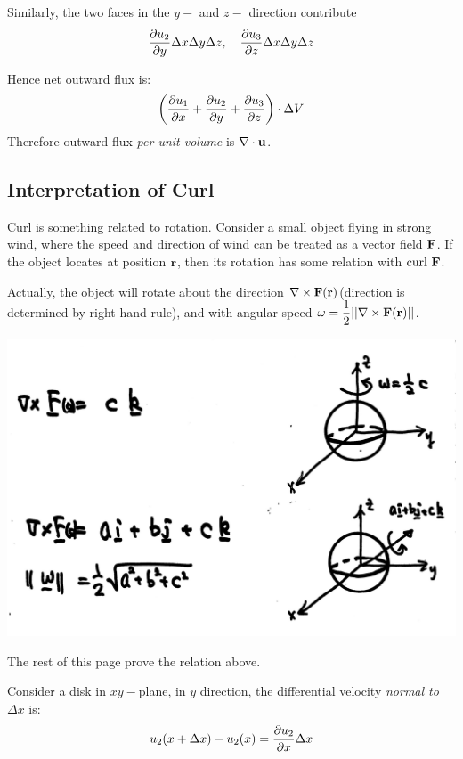 \begin{spacing}{1.3}
    Similarly, the two faces in the $y-$ and $z-$ direction contribute 
    $$\frac{\pt u_2}{\pt y} \Delta x \Delta y \Delta z, \quad \frac{\pt u_3}{\pt z} \Delta x \Delta y \Delta z$$

    Hence net outward flux is: 
    $$\left(\frac{\pt u_1}{\pt x} + \frac{\pt u_2}{\pt y} + \frac{\pt u_3}{\pt z}\right)\cdot \Delta V$$
    Therefore outward flux {\it per unit volume} is $\nabla \cdot \uu$.



    \newpage
    \subsection{Interpretation of Curl}

    Curl is something related to rotation. Consider a small object flying in strong wind,
    where the speed and direction of wind can be treated as a vector field $\FF$. If the object 
    locates at position $\rr$, then its rotation has some relation with $\curl \FF$.

    Actually, the object will rotate about the direction $\nabla \times \FF(\rr)$(direction 
    is determined by right-hand rule), and with angular speed $\omega = \dfrac{1}{2} ||\nabla \times \FF(\rr)||$.
    \begin{center}
        \includegraphics[scale=0.13]{images/Ch15-curl-rotation.png}
    \end{center}

    {\blue The rest of this page prove the relation above.}

    Consider a disk in $xy-$plane, in $y$ direction, the differential velocity 
    {\it normal to }$\Delta x$ is: 
    $$u_2(x+\Delta x)-u_2(x)=\dfrac{\pt u_2}{\pt x}\Delta x$$
    \begin{center}
        \begin{tikzpicture}[x=0.75pt,y=0.75pt,yscale=-1,xscale=1]


\end{tikzpicture}
\end{center}
\end{spacing}
